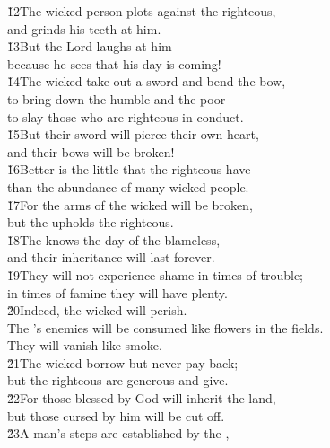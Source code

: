 \begin{poetry}
\poeml \v{12}The wicked person plots against the righteous, \\
\poemll    and grinds his teeth at him. \\
\poeml \v{13}But the Lord laughs at him \\
\poemll    because he sees that his day is coming! \\
\poeml \v{14}The wicked take out a sword and bend the bow, \\
\poemll    to bring down the humble and the poor \\
\poemlll       to slay those who are righteous in conduct. \\
\poeml \v{15}But their sword will pierce their own heart, \\
\poemll    and their bows will be broken! \\
\poeml \v{16}Better is the little that the righteous have \\
\poemll    than the abundance of many wicked people. \\
\poeml \v{17}For the arms of the wicked will be broken, \\
\poemll    but the  upholds the righteous. \\
\poeml \v{18}The  knows the day of the blameless, \\
\poemll    and their inheritance will last forever. \\
\poeml \v{19}They will not experience shame in times of trouble; \\
\poemll    in times of famine they will have plenty. \\
\poeml \v{20}Indeed, the wicked will perish. \\
\poemll    The 's enemies will be consumed like flowers in the fields. \\
\poemlll       They will vanish like smoke. \\
\poeml \v{21}The wicked borrow but never pay back; \\
\poemll    but the righteous are generous and give. \\
\poeml \v{22}For those blessed by God will inherit the land, \\
\poemll    but those cursed by him will be cut off. \\
\poeml \v{23}A man's steps are established by the , \\

\end{poetry}
